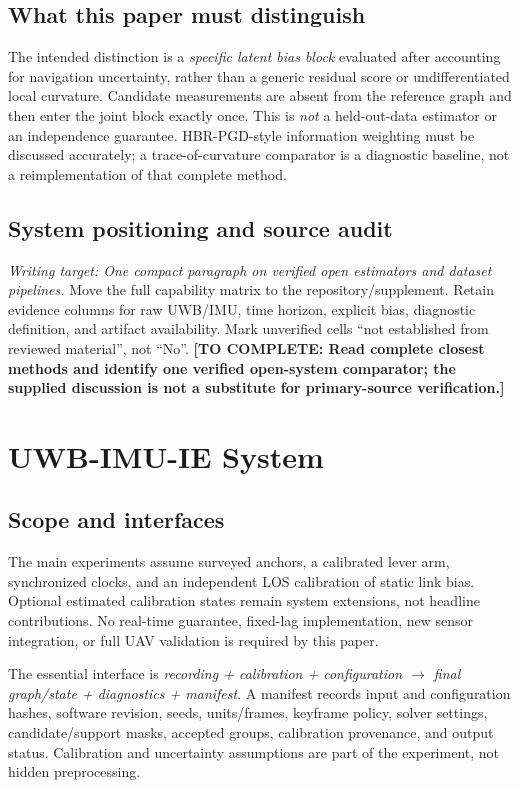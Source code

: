 \documentclass[conference]{IEEEtran}
\newcommand{\todo}[1]{\textcolor{red!70!black}{\textbf{[TO COMPLETE: #1]}}}
\newcommand{\plan}[1]{\textit{Writing target: #1}}
\begin{document}
\subsection{What this paper must distinguish}
The intended distinction is a \emph{specific latent bias block} evaluated after accounting for navigation uncertainty, rather than a generic residual score or undifferentiated local curvature. Candidate measurements are absent from the reference graph and then enter the joint block exactly once. This is \emph{not} a held-out-data estimator or an independence guarantee. HBR-PGD-style information weighting must be discussed accurately; a trace-of-curvature comparator is a diagnostic baseline, not a reimplementation of that complete method.

\subsection{System positioning and source audit}
\plan{One compact paragraph on verified open estimators and dataset pipelines.}
Move the full capability matrix to the repository/supplement. Retain evidence columns for raw UWB/IMU, time horizon, explicit bias, diagnostic definition, and artifact availability. Mark unverified cells ``not established from reviewed material'', not ``No''. \todo{Read complete closest methods and identify one verified open-system comparator; the supplied discussion is not a substitute for primary-source verification.}

\section{UWB-IMU-IE System}
\label{sec:system}
\subsection{Scope and interfaces}
The main experiments assume surveyed anchors, a calibrated lever arm, synchronized clocks, and an independent LOS calibration of static link bias. Optional estimated calibration states remain system extensions, not headline contributions. No real-time guarantee, fixed-lag implementation, new sensor integration, or full UAV validation is required by this paper.

The essential interface is
\emph{recording + calibration + configuration $\rightarrow$ final graph/state + diagnostics + manifest}.
A manifest records input and configuration hashes, software revision, seeds, units/frames, keyframe policy, solver settings, candidate/support masks, accepted groups, calibration provenance, and output status. Calibration and uncertainty assumptions are part of the experiment, not hidden preprocessing.
\end{document}
